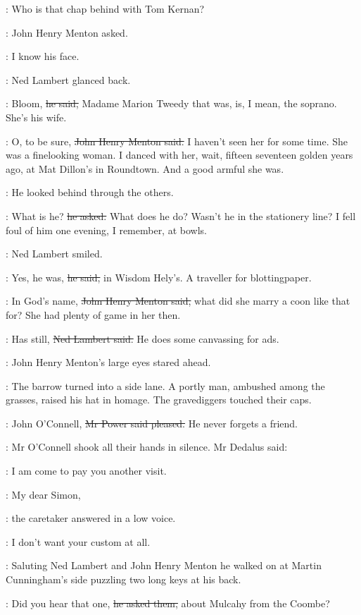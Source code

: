 \menton:
Who is that chap behind with Tom Kernan?

:
John Henry Menton asked.

\menton:
I know his face.

:
Ned Lambert glanced back.

\lambert:
Bloom,
\sout{he said,}
Madame Marion Tweedy that was,
is, I mean,
the soprano.
She's his wife.

\menton:
O, to be sure,
\sout{John Henry Menton said.}
I haven't seen her for some time.
She was a finelooking woman.
I danced with her, wait, fifteen seventeen golden years ago,
at Mat Dillon's in Roundtown.
And a good armful she was.

:
He looked behind through the others.

\menton:
What is he?
\sout{he asked.}
What does he do?
Wasn't he in the stationery line?
I fell foul of him one evening, I remember, at bowls.

:
Ned Lambert smiled.

\lambert:
Yes, he was,
\sout{he said,}
in Wisdom Hely's.
A traveller for blottingpaper.

\menton:
In God's name,
\sout{John Henry Menton said,}
what did she marry a coon like that for?
She had plenty of game in her then.

\lambert:
Has still,
\sout{Ned Lambert said.}
He does some canvassing for ads.

:
John Henry Menton's large eyes stared ahead.

:
The barrow turned into a side lane.
A portly man, ambushed among the grasses, raised his hat in homage.
The gravediggers touched their caps.

\power:
John O'Connell,
\sout{Mr Power said pleased.}
He never forgets a friend.

:
Mr O'Connell shook all their hands in silence.
Mr Dedalus said:

\simon:
I am come to pay you another visit.

\oconnell:
My dear Simon,

:
the caretaker answered in a low voice.

\oconnell:
I don't want your custom at all.

:
Saluting Ned Lambert and John Henry Menton
he walked on at Martin Cunningham's side
puzzling two long keys at his back.

\oconnell:
Did you hear that one,
\sout{he asked them,}
about Mulcahy from the Coombe?

